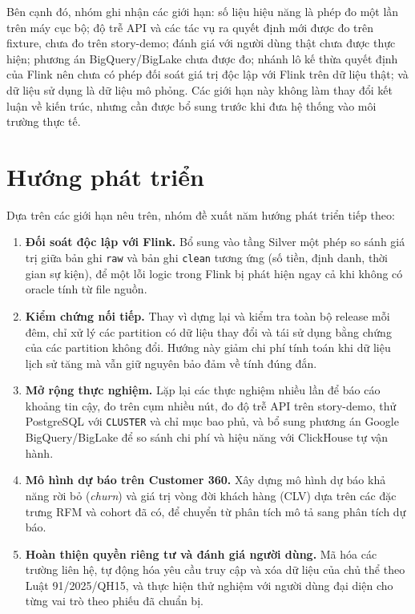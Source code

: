Bên cạnh đó, nhóm ghi nhận các giới hạn: số liệu hiệu năng là phép đo một lần trên máy cục bộ; độ trễ API và các tác vụ ra quyết định mới được đo trên fixture, chưa đo trên story-demo; đánh giá với người dùng thật chưa được thực hiện; phương án BigQuery/BigLake chưa được đo; nhánh lô kế thừa quyết định của Flink nên chưa có phép đối soát giá trị độc lập với Flink trên dữ liệu thật; và dữ liệu sử dụng là dữ liệu mô phỏng. Các giới hạn này không làm thay đổi kết luận về kiến trúc, nhưng cần được bổ sung trước khi đưa hệ thống vào môi trường thực tế.

\section{Hướng phát triển}
\label{sec:c6-huong-phat-trien}
Dựa trên các giới hạn nêu trên, nhóm đề xuất năm hướng phát triển tiếp theo:

\begin{enumerate}
    \item \textbf{Đối soát độc lập với Flink.} Bổ sung vào tầng Silver một phép so sánh giá trị giữa bản ghi \texttt{raw} và bản ghi \texttt{clean} tương ứng (số tiền, định danh, thời gian sự kiện), để một lỗi logic trong Flink bị phát hiện ngay cả khi không có oracle tính từ file nguồn.
    \item \textbf{Kiểm chứng nối tiếp.} Thay vì dựng lại và kiểm tra toàn bộ release mỗi đêm, chỉ xử lý các partition có dữ liệu thay đổi và tái sử dụng bằng chứng của các partition không đổi. Hướng này giảm chi phí tính toán khi dữ liệu lịch sử tăng mà vẫn giữ nguyên bảo đảm về tính đúng đắn.
    \item \textbf{Mở rộng thực nghiệm.} Lặp lại các thực nghiệm nhiều lần để báo cáo khoảng tin cậy, đo trên cụm nhiều nút, đo độ trễ API trên story-demo, thử PostgreSQL với \texttt{CLUSTER} và chỉ mục bao phủ, và bổ sung phương án Google BigQuery/BigLake để so sánh chi phí và hiệu năng với ClickHouse tự vận hành.
    \item \textbf{Mô hình dự báo trên Customer 360.} Xây dựng mô hình dự báo khả năng rời bỏ (\emph{churn}) và giá trị vòng đời khách hàng (CLV) dựa trên các đặc trưng RFM và cohort đã có, để chuyển từ phân tích mô tả sang phân tích dự báo.
    \item \textbf{Hoàn thiện quyền riêng tư và đánh giá người dùng.} Mã hóa các trường liên hệ, tự động hóa yêu cầu truy cập và xóa dữ liệu của chủ thể theo Luật 91/2025/QH15, và thực hiện thử nghiệm với người dùng đại diện cho từng vai trò theo phiếu đã chuẩn bị.
\end{enumerate}
